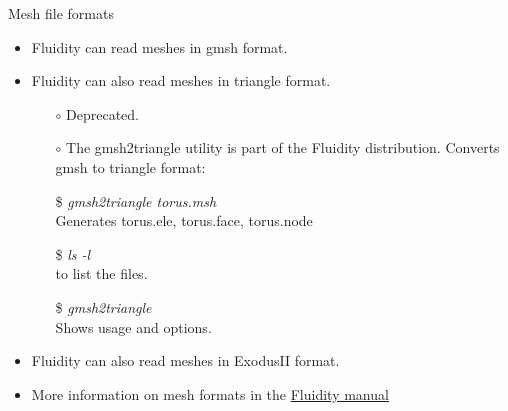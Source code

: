 \documentclass[t]{beamer}
\begin{document}
\begin{frame}{Mesh file formats}
   \begin{itemize}
      \item Fluidity can read meshes in gmsh format.\vspace{10pt}
      \item Fluidity can also read meshes in triangle format.
      \begin{itemize}
         \item[$\circ$] Deprecated.
         \item[$\circ$] The gmsh2triangle utility is part of the Fluidity distribution. Converts gmsh to triangle format:
         \item[\$] \emph{gmsh2triangle torus.msh} \\ \hspace{10pt} Generates torus.ele, torus.face, torus.node
         \item[\$] \emph{ls -l} \\ \hspace{10pt} to list the files.
         \item[\$] \emph{gmsh2triangle} \\ \hspace{10pt} Shows usage and options.\vspace{10pt}
      \end{itemize}
      \item Fluidity can also read meshes in ExodusII format.\vspace{10pt}
      \item More information on mesh formats in the \href{http://files.figshare.com/2031637/Fluidity.Manual.v.4.1.12.pdf}{Fluidity manual}
   \end{itemize}
\end{frame}
\end{document}
